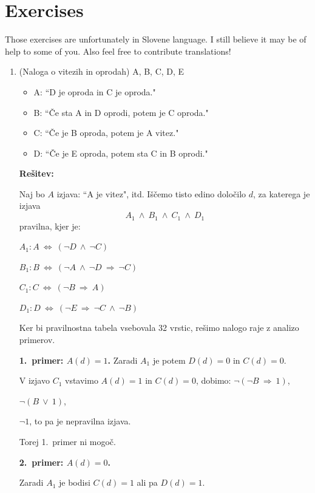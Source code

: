 \documentclass[11pt,paper=b5,footinclude,headinclude]{scrbook} %
\def\ali {{~\vee~}}
\def\inn {{~\wedge~}}
\def\sledi {{~\Rightarrow~}}
\def\cee {{~\Leftrightarrow~}}
\theoremstyle{remark}
\theoremstyle{definition} %
\theoremstyle{theorem} %
\begin{document}
\section{Exercises}
{Those exercises are unfortunately in Slovene language. I still believe it may be of help to some of you. Also feel free to contribute translations!}
\begin{enumerate}
    \item 
    (Naloga o vitezih in oprodah)
A, B, C, D, E
\begin{itemize}
  \item A: ``D je oproda in C je oproda."
  \item B: ``Če sta A in D oprodi, potem je C oproda."
  \item C: ``Če je B oproda, potem je A vitez."
  \item D: ``Če je E oproda, potem sta C in B oprodi."
\end{itemize}

\medskip
\textbf{Rešitev:}

Naj bo $A$ izjava: ``A je vitez", itd.
Iščemo tisto edino določilo $d$, za katerega je izjava $$A_1\inn B_1\inn C_1\inn D_1$$
pravilna, kjer je:

$A_1: A\cee (\neg D \inn \neg C)$

$B_1: B\cee (\neg A \inn \neg D\sledi \neg C)$

$C_1: C\cee (\neg B \sledi A)$

$D_1: D\cee (\neg E \sledi \neg C \inn \neg B)$


Ker bi pravilnostna tabela vsebovala 32 vrstic, rešimo nalogo
raje z analizo primerov.

\textbf{1.~primer: $A(d) = 1$.}
Zaradi $A_1$ je potem $D(d) = 0$ in $C(d) = 0$.

V izjavo $C_1$ vstavimo $A(d) = 1$ in $C(d) = 0$, dobimo:
$\neg(\neg B\sledi 1)$,

$\neg(B\ali 1)$,

$\neg 1$, to pa je nepravilna izjava.

Torej 1.~primer ni mogoč.
%
%
%
%
%
%

\textbf{2.~primer: $A(d) = 0$.}

Zaradi $A_1$ je bodisi $C(d) = 1$ ali pa $D(d) = 1$.


\end{enumerate}
\end{document}
